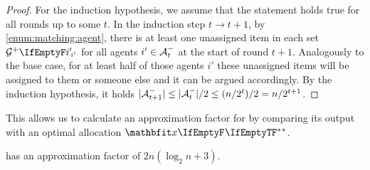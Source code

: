 \begin{proof}
	For the induction hypothesis, we assume that the statement holds true for all rounds up to some \(t\).
	In the induction step \(t \to t+1\), by \cref{enum:matching:agent}, there is at least one unassigned item in each set \(\overlygoodset[i']\) for all agents \(i' \in \mathcal{A}^-_{t}\) at the start of round \(t+1\).
	Analogously to the base case, for at least half of those agents \(i'\) these unassigned items will be assigned to them or someone else and it can be argued accordingly.
	By the induction hypothesis, it holds \(\vert\mathcal{A}^-_{t+1}\vert \le \vert\mathcal{A}^-_{t}\vert/2 \le (n/2^t)/2 = n/2^{t+1}\).
\end{proof}

This allows us to calculate an approximation factor for \RepReMatch{} by comparing its output with an optimal allocation \(\alloc*[][]\).
\begin{theorem}
	\label{th:reprematch}
	\RepReMatch{} has an approximation factor of \(2n (\log_2 n + 3)\).
\end{theorem}
